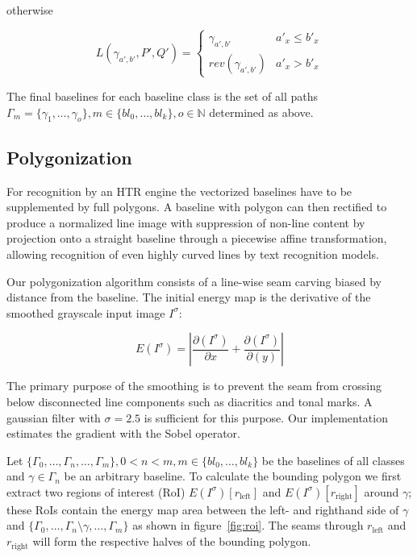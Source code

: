 otherwise 

\begin{equation*}
	L(\gamma_{a', b'}, P', Q') = 
	\begin{cases}
		\gamma_{a', b'} & a'_x \leq b'_x\\
		rev(\gamma_{a', b'}) & a'_x > b'_x
	\end{cases}
\end{equation*}

The final baselines for each baseline class is the set of all paths $\Gamma_m =
\{\gamma_1, \dots, \gamma_o\}, m \in \{bl_0, \dots, bl_k\}, o \in \mathbb{N}$ determined as above.

\subsection{Polygonization}

For recognition by an HTR engine the vectorized baselines have to be
supplemented by full polygons. A baseline with polygon can then rectified to
produce a normalized line image with suppression of non-line content by
projection onto a straight baseline through a piecewise affine transformation,
allowing recognition of even highly curved lines by text recognition models.

Our polygonization algorithm consists of a line-wise seam carving
\cite{avidan2007seam} biased by distance from the baseline. The initial energy
map is the derivative of the smoothed grayscale input image $I^\sigma$:

\begin{equation*}
	E(I^\sigma) = \left\vert\frac{\partial(I^\sigma)}{\partial x} + \frac{\partial(I^\sigma)}{\partial(y)}\right\vert
\end{equation*}

The primary purpose of the smoothing is to prevent the seam from crossing below
disconnected line components such as diacritics and tonal marks. A gaussian
filter with $\sigma = 2.5$ is sufficient for this purpose. Our implementation
estimates the gradient with the Sobel operator.

Let $\{\Gamma_0, \dots, \Gamma_n, \dots, \Gamma_m\}, 0 < n < m, m \in \{bl_0,
\dots, bl_k\}$ be the baselines of all classes and $\gamma \in \Gamma_n$ be an
arbitrary baseline. To calculate the bounding polygon we first extract two
regions of interest (RoI) $E(I^\sigma)[r_\text{left}]$ and $E(I^\sigma)[r_\text{right}]$
around $\gamma$; these RoIs contain the energy map area between the left- and
righthand side of $\gamma$ and $\{\Gamma_0, \dots, \Gamma_n \setminus \gamma,
\dots, \Gamma_m\}$ as shown in figure~\ref{fig:roi}.  The seams through
$r_\text{left}$ and $r_\text{right}$ will form the respective halves of the bounding
polygon. 

